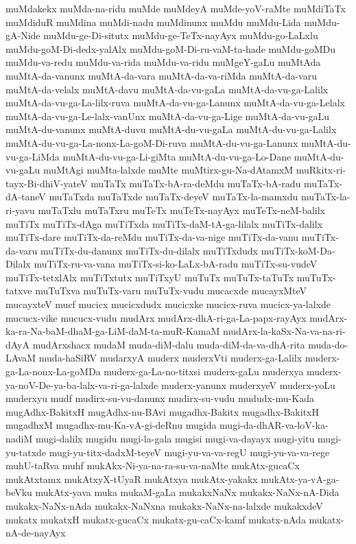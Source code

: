 {muMdakekx
muMda-na-ridu
muMde
muMdeyA
muMde-yoV-raMte
muMdiTaTx
muMdiduR
muMdina
muMdi-nadu
muMdinunx
muMdu
muMdu-Lida
muMdu-gA-Nide
muMdu-ge-Di-situtx
muMdu-ge-TeTx-nayAyx
muMdu-go-LaLxlu
muMdu-goM-Di-dedx-yalAlx
muMdu-goM-Di-ru-vaM-ta-hade
muMdu-goMDu
muMdu-va-redu
muMdu-va-rida
muMdu-va-ridu
muMgeY-gaLu
muMtAda
muMtA-da-vanunx
muMtA-da-vara
muMtA-da-va-riMda
muMtA-da-varu
muMtA-da-velalx
muMtA-davu
muMtA-da-vu-gaLa
muMtA-da-vu-ga-Lalilx
muMtA-da-vu-ga-La-lilx-ruva
muMtA-da-vu-ga-Lanunx
muMtA-da-vu-ga-Lelalx
muMtA-da-vu-ga-Le-lalx-vanUnx
muMtA-da-vu-ga-Lige
muMtA-da-vu-gaLu
muMtA-du-vanunx
muMtA-duvu
muMtA-du-vu-gaLa
muMtA-du-vu-ga-Lalilx
muMtA-du-vu-ga-La-nonx-La-goM-Di-ruva
muMtA-du-vu-ga-Lanunx
muMtA-du-vu-ga-LiMda
muMtA-du-vu-ga-Li-giMta
muMtA-du-vu-ga-Lo-Dane
muMtA-du-vu-gaLu
muMtAgi
muMta-lalxde
muMte
muMtirx-gu-Na-dAtamxM
muRkitx-ri-tayx-Bi-dhiV-yateV
muTaTx
muTaTx-bA-ra-deMdu
muTaTx-bA-radu
muTaTx-dA-taneV
muTaTxda
muTaTxde
muTaTx-deyeV
muTaTx-la-mamxdu
muTaTx-la-ri-yavu
muTaTxlu
muTaTxru
muTeTx
muTeTx-nayAyx
muTeTx-neM-balilx
muTiTx
muTiTx-dAga
muTiTxda
muTiTx-daM-tA-ga-lilalx
muTiTx-dalilx
muTiTx-dare
muTiTx-da-reMdu
muTiTx-da-va-nige
muTiTx-da-vanu
muTiTx-da-varu
muTiTx-du-danunx
muTiTx-du-dilalx
muTiTxdudx
muTiTx-koM-Da-Dilalx
muTiTx-ru-va-vana
muTiTx-si-ko-LaLx-bA-radu
muTiTx-su-vudeV
muTiTx-tetxlAlx
muTiTxtutx
muTiTxyU
muTuTx
muTuTx-taTuTx
muTuTx-tatxve
muTuTxva
muTuTx-varu
muTuTx-vudu
mucacxde
mucayxMteV
mucayxteV
mucf
mucicx
mucicxdudx
mucicxke
mucicx-ruva
mucicx-ya-lalxde
mucucx-vike
mucucx-vudu
mudArx
mudArx-dhA-ri-ga-La-papx-rayAyx
mudArx-ka-ra-Na-baM-dhaM-ga-LiM-daM-ta-muR-KamaM
mudArx-la-kaSx-Na-va-na-ri-dAyA
mudArxshacx
mudaM
muda-diM-dalu
muda-diM-da-va-dhA-rita
muda-do-LAvaM
muda-haSiRV
mudarxyA
muderx
muderxVti
muderx-ga-Lalilx
muderx-ga-La-nonx-La-goMDa
muderx-ga-La-no-titxsi
muderx-gaLu
muderxya
muderx-ya-noV-De-ya-ba-lalx-va-ri-ga-lalxde
muderx-yanunx
muderxyeV
muderx-yoLu
muderxyu
mudf
mudirx-su-vu-danunx
mudirx-su-vudu
mududx-mu-Kada
mugAdhx-BakitxH
mugAdhx-nu-BAvi
mugadhx-Bakitx
mugadhx-BakitxH
mugadhxM
mugadhx-mu-Ka-vA-gi-deRnu
mugida
mugi-da-dhAR-va-loV-ka-nadiM
mugi-dalilx
mugidu
mugi-la-gala
mugisi
mugi-va-dayayx
mugi-yitu
mugi-yu-tatxde
mugi-yu-titx-dadxM-teyeV
mugi-yu-va-va-regU
mugi-yu-va-va-rege
muhU-taRva
muhf
mukAkx-Ni-ya-na-ra-su-va-naMte
mukAtx-gucaCx
mukAtxtamx
mukAtxyX-tUyaR
mukAtxya
mukAtx-yakakx
mukAtx-ya-vA-ga-beVku
mukAtx-yava
muka
mukaM-gaLa
mukakxNaNx
mukakx-NaNx-nA-Dida
mukakx-NaNx-nAda
mukakx-NaNxna
mukakx-NaNx-na-lalxde
mukakxdeV
mukatx
mukatxH
mukatx-gucaCx
mukatx-gu-caCx-kamf
mukatx-nAda
mukatx-nA-de-nayAyx
}
